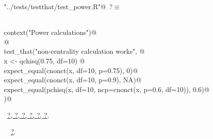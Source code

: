 \documentclass[reqno]{amsart}
\renewcommand{\NWtarget}[2]{\hypertarget{#1}{#2}}
\renewcommand{\NWlink}[2]{\hyperlink{#1}{#2}}
\begin{document}
\begin{flushleft} \small\label{scrap15}\raggedright\small
\NWtarget{nuweb?}{} \verb@"../tests/testthat/test_power.R"@\nobreak\ {\footnotesize {?}}$\equiv$
\vspace{-1ex}
\begin{list}{}{} \item
\mbox{}\verb@@\\
\mbox{}\verb@  context("Power calculations")@\\
\mbox{}\verb@  @\\
\mbox{}\verb@  test_that("non-centrality calculation works", {@\\
\mbox{}\verb@    x <- qchisq(0.75, df=10) @\\
\mbox{}\verb@    expect_equal(cnonct(x, df=10, p=0.75), 0)@\\
\mbox{}\verb@    expect_equal(cnonct(x, df=10, p=0.9), NA)@\\
\mbox{}\verb@    expect_equal(pchisq(x, df=10, ncp=cnonct(x, p=0.6, df=10)), 0.6)@\\
\mbox{}\verb@  })@\\
\mbox{}\verb@@{\NWsep}
\end{list}
\vspace{-1.5ex}
\footnotesize
\begin{list}{}{\setlength{\itemsep}{-\parsep}\setlength{\itemindent}{-\leftmargin}}
\item \NWtxtFileDefBy\ \NWlink{nuweb?}{?}\NWlink{nuweb?}{, ?}\NWlink{nuweb?}{, ?}\NWlink{nuweb?}{, ?}\NWlink{nuweb?}{, ?}\NWlink{nuweb?}{, ?}.
\item \NWtxtIdentsUsed\nobreak\  \verb@cnonct@\nobreak\ \NWlink{nuweb?}{?}.
\item{}
\end{list}
\vspace{4ex}
\end{flushleft}
\end{document}
